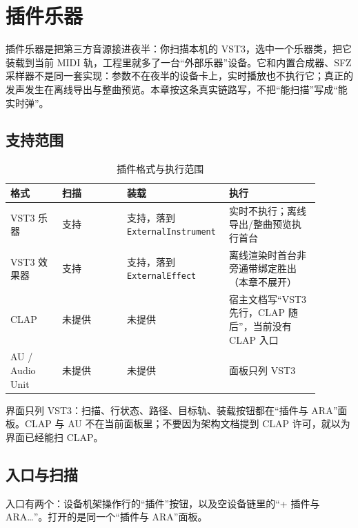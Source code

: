 \chapter{插件乐器}
\label{chap:plugin-instruments}


插件乐器是把第三方音源接进夜半：你扫描本机的 VST3，选中一个乐器类，把它装载到当前 MIDI 轨，工程里就多了一台“外部乐器”设备。它和内置合成器、SFZ 采样器不是同一套实现：参数不在夜半的设备卡上，实时播放也不执行它；真正的发声发生在离线导出与整曲预览。本章按这条真实链路写，不把“能扫描”写成“能实时弹”。

\section{支持范围}

\begin{table}[htbp]
\centering
\small
\begin{tabular}{@{}p{0.16\linewidth}p{0.20\linewidth}p{0.25\linewidth}p{0.28\linewidth}@{}}
\hline
格式 & 扫描 & 装载 & 执行 \\
\hline
VST3 乐器 & 支持 & 支持，落到 \texttt{ExternalInstrument} & 实时不执行；离线导出/整曲预览执行首台 \\
VST3 效果器 & 支持 & 支持，落到 \texttt{ExternalEffect} & 离线渲染时首台非旁通带绑定胜出（本章不展开） \\
CLAP & 未提供 & 未提供 & 宿主文档写“VST3 先行，CLAP 随后”，当前没有 CLAP 入口 \\
AU / Audio Unit & 未提供 & 未提供 & 面板只列 VST3 \\
\hline
\end{tabular}
\caption{插件格式与执行范围}
\label{tab:plugin-formats}
\end{table}

界面只列 VST3：扫描、行状态、路径、目标轨、装载按钮都在“插件与 ARA”面板。CLAP 与 AU 不在当前面板里；不要因为架构文档提到 CLAP 许可，就以为界面已经能扫 CLAP。

\section{入口与扫描}

入口有两个：设备机架操作行的“插件”按钮，以及空设备链里的“+ 插件与 ARA…”。打开的是同一个“插件与 ARA”面板。

